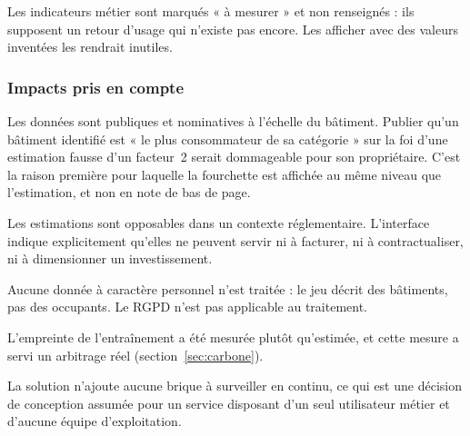 Les indicateurs métier sont marqués « à mesurer » et non renseignés : ils
supposent un retour d'usage qui n'existe pas encore. Les afficher avec des
valeurs inventées les rendrait inutiles.

\subsubsection*{Impacts pris en compte}

\begin{description}[leftmargin=0em,style=nextline,itemsep=0.35em]
  \item[Éthique et réputationnel] Les données sont publiques et nominatives à
        l'échelle du bâtiment. Publier qu'un bâtiment identifié est « le plus
        consommateur de sa catégorie » sur la foi d'une estimation fausse d'un
        facteur~2 serait dommageable pour son propriétaire. C'est la raison
        première pour laquelle la fourchette est affichée au même niveau que
        l'estimation, et non en note de bas de page.
  \item[Légal] Les estimations sont opposables dans un contexte réglementaire.
        L'interface indique explicitement qu'elles ne peuvent servir ni à
        facturer, ni à contractualiser, ni à dimensionner un investissement.
  \item[Données personnelles] Aucune donnée à caractère personnel n'est traitée :
        le jeu décrit des bâtiments, pas des occupants. Le RGPD n'est pas
        applicable au traitement.
  \item[Environnemental] L'empreinte de l'entraînement a été mesurée plutôt
        qu'estimée, et cette mesure a servi un arbitrage réel
        (section~\ref{sec:carbone}).
  \item[Organisationnel] La solution n'ajoute aucune brique à surveiller en
        continu, ce qui est une décision de conception assumée pour un service
        disposant d'un seul utilisateur métier et d'aucune équipe d'exploitation.
\end{description}

\newpage
